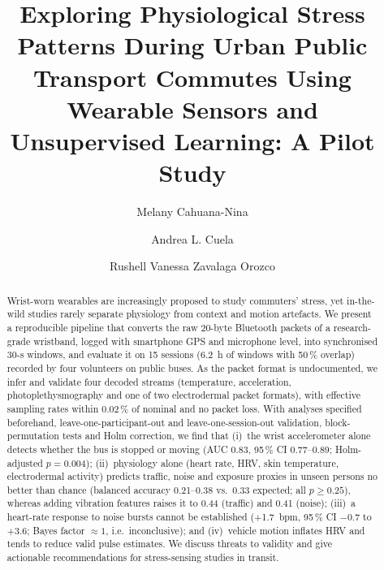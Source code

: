 \documentclass[runningheads]{llncs}
\begin{document}

\title{Exploring Physiological Stress Patterns During Urban Public
Transport Commutes Using Wearable Sensors and Unsupervised Learning:
A Pilot Study}

\author{Melany Cahuana-Nina \and Andrea L. Cuela \and Rushell Vanessa Zavalaga Orozco}


\maketitle

\begin{abstract}
Wrist-worn wearables are increasingly proposed to study commuters' stress, yet in-the-wild studies rarely separate physiology from context and motion artefacts. We present a reproducible pipeline that converts the raw 20-byte Bluetooth packets of a research-grade wristband, logged with smartphone GPS and microphone level, into synchronised 30-s windows, and evaluate it on 15 sessions (6.2~h of windows with 50\,\% overlap) recorded by four volunteers on public buses. As the packet format is undocumented, we infer and validate four decoded streams (temperature, acceleration, photoplethysmography and one of two electrodermal packet formats), with effective sampling rates within 0.02\,\% of nominal and no packet loss. With analyses specified beforehand, leave-one-participant-out and leave-one-session-out validation, block-permutation tests and Holm correction, we find that (i)~the wrist accelerometer alone detects whether the bus is stopped or moving (AUC 0.83, 95\,\% CI 0.77--0.89; Holm-adjusted $p=0.004$); (ii)~physiology alone (heart rate, HRV, skin temperature, electrodermal activity) predicts traffic, noise and exposure proxies in unseen persons no better than chance (balanced accuracy 0.21--0.38 vs.\ 0.33 expected; all $p\geq0.25$), whereas adding vibration features raises it to 0.44 (traffic) and 0.41 (noise); (iii)~a heart-rate response to noise bursts cannot be established (+1.7~bpm, 95\,\% CI $-0.7$ to $+3.6$; Bayes factor $\approx1$, i.e.\ inconclusive); and (iv)~vehicle motion inflates HRV and tends to reduce valid pulse estimates. We discuss threats to validity and give actionable recommendations for stress-sensing studies in transit.
\end{abstract}
\end{document}
